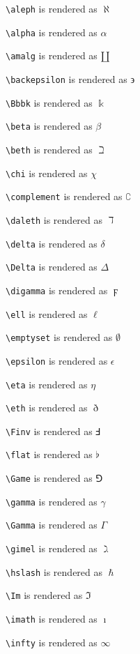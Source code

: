 \texttt{\textbackslash aleph} is rendered as $\aleph$


\texttt{\textbackslash alpha} is rendered as $\alpha$


\texttt{\textbackslash amalg} is rendered as $\amalg$


\texttt{\textbackslash backepsilon} is rendered as $\backepsilon$


\texttt{\textbackslash Bbbk} is rendered as $\Bbbk$


\texttt{\textbackslash beta} is rendered as $\beta$


\texttt{\textbackslash beth} is rendered as $\beth$


\texttt{\textbackslash chi} is rendered as $\chi$


\texttt{\textbackslash complement} is rendered as $\complement$


\texttt{\textbackslash daleth} is rendered as $\daleth$


\texttt{\textbackslash delta} is rendered as $\delta$


\texttt{\textbackslash Delta} is rendered as $\Delta$


\texttt{\textbackslash digamma} is rendered as $\digamma$


\texttt{\textbackslash ell} is rendered as $\ell$


\texttt{\textbackslash emptyset} is rendered as $\emptyset$


\texttt{\textbackslash epsilon} is rendered as $\epsilon$


\texttt{\textbackslash eta} is rendered as $\eta$


\texttt{\textbackslash eth} is rendered as $\eth$


\texttt{\textbackslash Finv} is rendered as $\Finv$


\texttt{\textbackslash flat} is rendered as $\flat$


\texttt{\textbackslash Game} is rendered as $\Game$


\texttt{\textbackslash gamma} is rendered as $\gamma$


\texttt{\textbackslash Gamma} is rendered as $\Gamma$


\texttt{\textbackslash gimel} is rendered as $\gimel$


\texttt{\textbackslash hslash} is rendered as $\hslash$


\texttt{\textbackslash Im} is rendered as $\Im$


\texttt{\textbackslash imath} is rendered as $\imath$


\texttt{\textbackslash infty} is rendered as $\infty$


